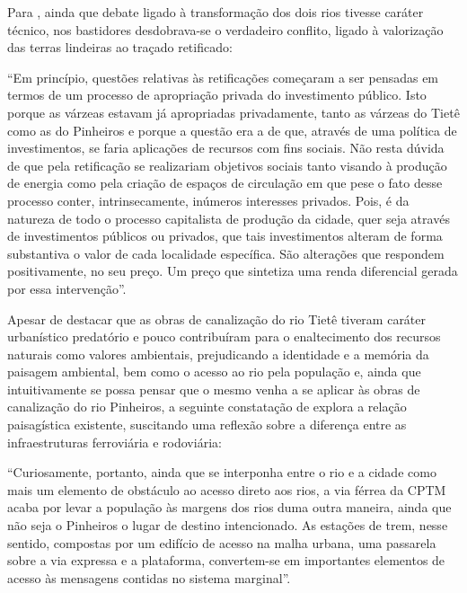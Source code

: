 \documentclass[
article,			%
11pt,				%
oneside,			%
a4paper,			%
english,			%
brazil,				%
sumario=tradicional
]{abntex2}
\begin{document}
	Para , ainda que debate ligado à transformação dos dois rios tivesse caráter técnico, nos bastidores desdobrava-se o verdadeiro conflito, ligado à valorização das terras lindeiras ao traçado retificado:
	
	\begin{citacao}
		``Em princípio, questões relativas às retificações começaram a ser pensadas em termos de um processo de apropriação privada do investimento público. Isto porque as várzeas estavam já apropriadas privadamente, tanto as várzeas do Tietê como as do Pinheiros e porque a questão era a de que, através de uma política de investimentos, se faria aplicações de recursos com fins sociais. Não resta dúvida de que pela retificação se realizariam objetivos sociais tanto visando à produção de energia como pela criação de espaços de circulação em que pese o fato desse processo conter, intrinsecamente, inúmeros interesses privados. Pois, é da natureza de todo o processo capitalista de produção da cidade, quer seja através de investimentos públicos ou privados, que tais investimentos alteram de forma substantiva o valor de cada localidade específica. São alterações que respondem positivamente, no seu preço. Um preço que sintetiza uma renda diferencial gerada por essa intervenção''.
	\end{citacao}
	
	Apesar de  destacar que as obras de canalização do rio Tietê tiveram caráter urbanístico predatório e pouco contribuíram para o enaltecimento dos recursos naturais como valores ambientais, prejudicando a identidade e a memória da paisagem ambiental, bem como o acesso ao rio pela população e, ainda que intuitivamente se possa pensar que o mesmo venha a se aplicar às obras de canalização do rio Pinheiros, a seguinte constatação de  explora a relação paisagística existente, suscitando uma reflexão sobre a diferença entre as infraestruturas ferroviária e rodoviária:
	
	\begin{citacao}
		``Curiosamente, portanto, ainda que se interponha entre o rio e a cidade como mais um elemento de obstáculo ao acesso direto aos rios, a via férrea da CPTM acaba por levar a população às margens dos rios duma outra maneira, ainda que não seja o Pinheiros o lugar de destino intencionado. As estações de trem, nesse sentido, compostas por um edifício de acesso na malha urbana, uma passarela sobre a via expressa e a plataforma, convertem-se em importantes elementos de acesso às mensagens contidas no sistema marginal''.
	\end{citacao}
	
\end{document}
